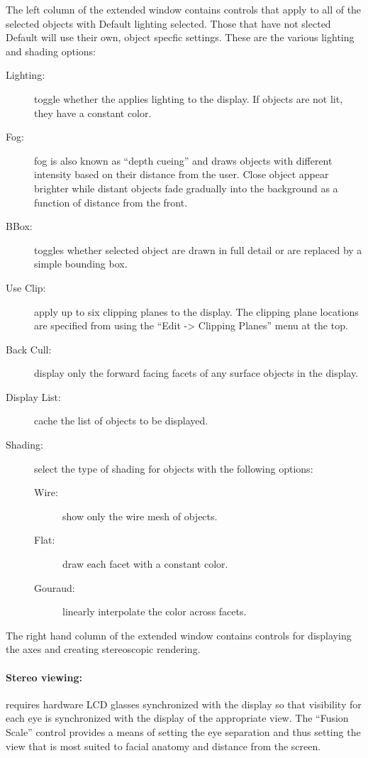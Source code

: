 The left column of the extended \viewer{} window contains controls that
apply to all of the selected objects with Default lighting selected.
Those that have not slected Default will use their own, object specfic
settings.  These are the various lighting and shading options:
\begin{description}
  \item [Lighting: ] toggle whether the \viewer{} applies lighting to the
        display.  If objects are not lit, they have a constant color.
  \item [Fog: ] fog is also known as ``depth cueing'' and draws objects
        with different intensity based on their distance from the user.
        Close object appear brighter while distant objects fade gradually
        into the background as a function of distance from the front. 
  \item [BBox: ] toggles whether selected object are drawn in full
        detail or are replaced by a simple bounding box.
  \item [Use Clip: ] apply up to six clipping planes to the display.
        The clipping plane locations are specified from using the
        ``Edit -> Clipping Planes'' menu at the top.
  \item [Back Cull: ] display only the forward facing facets of any surface
        objects in the display.
  \item [Display List: ] cache the list of objects to be displayed.
  \item [Shading: ] select the type of shading for objects with the
        following options:
        \begin{description}
          \item [Wire: ] show only the wire mesh of objects.
          \item [Flat: ] draw each facet with a constant color.
          \item [Gouraud: ] linearly interpolate the color across facets. 
        \end{description}
\end{description}

The right hand column of the extended \viewer{} window contains controls
for displaying the axes and creating stereoscopic rendering.  

\paragraph{Stereo viewing: } requires hardware LCD glasses synchronized
with the display so that visibility for each eye is synchronized with the
display of the appropriate view.  The ``Fusion Scale'' control provides a
means of setting the eye separation and thus setting the view that is most
suited to facial anatomy and distance from the screen.

